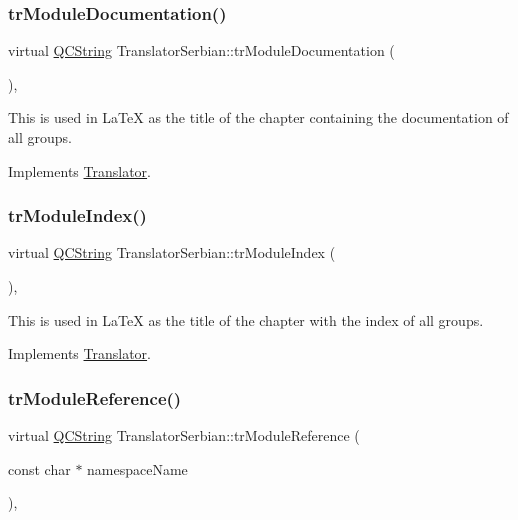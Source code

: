 \subsubsection{\texorpdfstring{trModuleDocumentation()}{trModuleDocumentation()}}
{\footnotesize\ttfamily virtual \mbox{\hyperlink{class_q_c_string}{Q\+C\+String}} Translator\+Serbian\+::tr\+Module\+Documentation (\begin{DoxyParamCaption}{ }\end{DoxyParamCaption})\hspace{0.3cm}{\ttfamily [inline]}, {\ttfamily [virtual]}}

This is used in La\+TeX as the title of the chapter containing the documentation of all groups. 

Implements \mbox{\hyperlink{class_translator}{Translator}}.

\mbox{\label{class_translator_serbian_aa78f2a7500c7a180b7045e62f89150fa}} 
\subsubsection{\texorpdfstring{trModuleIndex()}{trModuleIndex()}}
{\footnotesize\ttfamily virtual \mbox{\hyperlink{class_q_c_string}{Q\+C\+String}} Translator\+Serbian\+::tr\+Module\+Index (\begin{DoxyParamCaption}{ }\end{DoxyParamCaption})\hspace{0.3cm}{\ttfamily [inline]}, {\ttfamily [virtual]}}

This is used in La\+TeX as the title of the chapter with the index of all groups. 

Implements \mbox{\hyperlink{class_translator}{Translator}}.

\mbox{\label{class_translator_serbian_aa4daa80a0788783f702711d1e95e2287}} 
\subsubsection{\texorpdfstring{trModuleReference()}{trModuleReference()}}
{\footnotesize\ttfamily virtual \mbox{\hyperlink{class_q_c_string}{Q\+C\+String}} Translator\+Serbian\+::tr\+Module\+Reference (\begin{DoxyParamCaption}\item[{const char $\ast$}]{namespace\+Name }\end{DoxyParamCaption})\hspace{0.3cm}{\ttfamily [inline]}, {\ttfamily [virtual]}}

